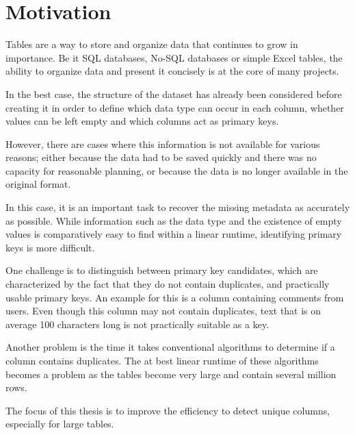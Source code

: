 \chapter{Motivation}
Tables are a way to store and organize data that continues to grow in importance. Be it SQL databases, No-SQL databases or simple Excel tables, the ability to organize data and present it concisely is at the core of many projects.

In the best case, the structure of the dataset has already been considered before creating it in order to define which data type can occur in each column, whether values can be left empty and which columns act as primary keys.

However, there are cases where this information is not available for various reasons; either because the data had to be saved quickly and there was no capacity for reasonable planning, or because the data is no longer available in the original format. %

In this case, it is an important task to recover the missing metadata as accurately as possible. While information such as the data type and the existence of empty values is comparatively easy to find within a linear runtime, identifying primary keys is more difficult.

One challenge is to distinguish between primary key candidates, which are characterized by the fact that they do not contain duplicates, and practically usable primary keys. An example for this is a column containing comments from users. Even though this column may not contain duplicates, text that is on average 100 characters long is not practically suitable as a key.

Another problem is the time it takes conventional algorithms to determine if a column contains duplicates. The at best linear runtime of these algorithms becomes a problem as the tables become very large and contain several million rows.

The focus of this thesis is to improve the efficiency to detect unique columns, especially for large tables.
